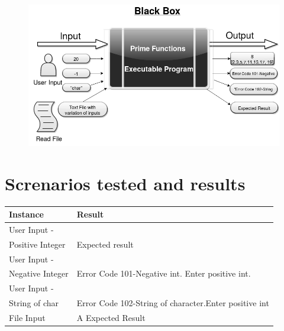 \documentclass[11 pt]{article}
\begin{document}
    \begin{figure}[h]
    \centering
    
    \includegraphics[width=\linewidth]{Black Box Diagram.png}
    \end{figure}
 
\section{Screnarios tested and results}
\begin{tabular}{|p{3cm}|p{9cm}|}
\hline
\textbf{Instance} & \textbf{Result}\\
\hline
User Input -\\ Positive Integer  &  Expected result\\
\hline
User Input -\\Negative Integer &  Error Code 101-Negative int. Enter positive int.\\
\hline
User Input -\\String of char & Error Code 102-String of character.Enter positive int\\
\hline
File Input & A Expected Result\\
\hline

    
\end{tabular}

 
\end{document}
